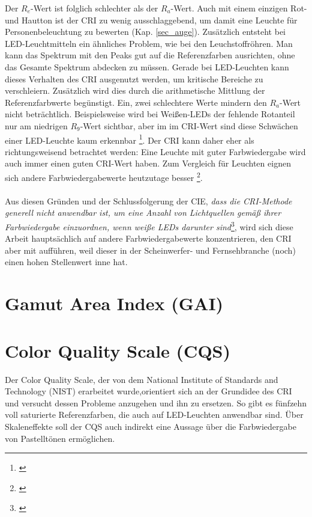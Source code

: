 Der $R_{e}$-Wert ist folglich schlechter als der $R_{a}$-Wert. Auch mit einem einzigen Rot- und Hautton ist der CRI zu wenig ausschlaggebend, um damit eine Leuchte für Personenbeleuchtung zu bewerten (Kap. \ref{sec_auge}). Zusätzlich entsteht bei LED-Leuchtmitteln ein ähnliches Problem, wie bei den Leuchstoffröhren. Man kann das Spektrum mit den Peaks gut auf die Referenzfarben ausrichten, ohne das Gesamte Spektrum abdecken zu müssen. Gerade bei LED-Leuchten kann dieses Verhalten des CRI ausgenutzt werden, um kritische Bereiche zu verschleiern. Zusätzlich wird dies durch die arithmetische Mittlung der Referenzfarbwerte begünstigt. Ein, zwei schlechtere Werte mindern den $R_{a}$-Wert nicht beträchtlich. Beispielsweise wird bei Weißen-LEDs  der fehlende Rotanteil nur am niedrigen $R_{9}$-Wert sichtbar, aber im im CRI-Wert sind diese Schwächen einer LED-Leuchte kaum erkennbar \footnote{\cite{davis_ohno}}. Der CRI kann daher eher als richtungsweisend betrachtet werden: Eine Leuchte mit guter Farbwiedergabe wird auch immer einen guten CRI-Wert haben. Zum Vergleich für Leuchten eignen sich andere Farbwiedergabewerte heutzutage besser \footnote{\cite{production partner}}.\\\\
Aus diesen Gründen und der Schlussfolgerung der CIE, \emph{\glqq dass die CRI-Methode generell nicht anwendbar ist, um eine Anzahl von Lichtquellen gemäß ihrer Farbwiedergabe einzuordnen, wenn weiße LEDs darunter sind\grqq}\footnote{\citep[VI]{CIE}}, wird sich diese Arbeit hauptsächlich auf andere Farbwiedergabewerte konzentrieren, den CRI aber mit aufführen, weil dieser in der Scheinwerfer- und Fernsehbranche (noch) einen hohen Stellenwert inne hat.

\section{Gamut Area Index (GAI)} \label{sec_gai}



\section{Color Quality Scale (CQS)} \label{sec_cqs}

Der Color Quality Scale, der von dem National Institute of Standards and Technology (NIST) erarbeitet wurde,orientiert sich an der Grundidee des CRI und versucht dessen Probleme anzugehen und ihn zu ersetzen. So gibt es fünfzehn voll saturierte Referenzfarben, die auch auf LED-Leuchten anwendbar sind. Über Skaleneffekte soll der CQS auch indirekt eine Aussage über die Farbwiedergabe von Pastelltönen ermöglichen. 

